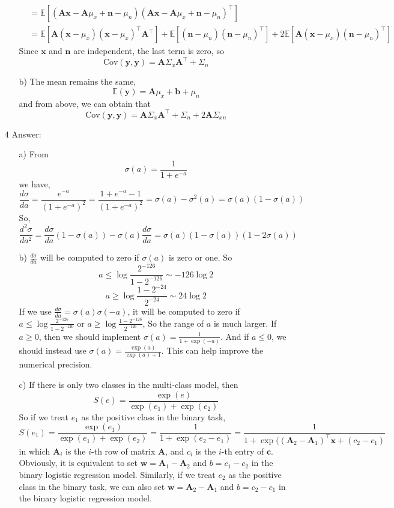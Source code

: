 \documentclass{article}
\begin{document}
\begin{itemize}
\begin{itemize}
\begin{equation*}
\begin{split}
	&= \mathbb{E}\left[\left(\mathbf{A}\mathbf{x} - \mathbf{A}\mu_x+\mathbf{n} - \mu_n\right) \left( \mathbf{A}\mathbf{x} - \mathbf{A}\mu_x+\mathbf{n} - \mu_n\right)^\top \right] \\
	&= \mathbb{E}\left[ \mathbf{A}\left(\mathbf{x} - \mu_x\right) \left(\mathbf{x} - \mu_x\right)^\top\mathbf{A}^\top \right] +  \mathbb{E}\left[\left(\mathbf{n} - \mu_n\right) \left(\mathbf{n} - \mu_n\right)^\top \right] + 2 \mathbb{E}\left[\mathbf{A}\left( \mathbf{x} - \mu_x\right) \left(\mathbf{n} - \mu_n\right)^\top \right] 
	\end{split}
	\end{equation*}
	Since $\mathbf{x}$ and $\mathbf{n}$ are independent, the last term is zero, so 
	$$\text{Cov}(\mathbf{y},\mathbf{y})  = \mathbf{A} \Sigma_x \mathbf{A}^\top + \Sigma_n$$
	\item[b)] The mean remains the same, 
	$$\mathbb{E}(\mathbf{y}) =  \mathbf{A}\mu_x+\mathbf{b}+\mu_n$$
	and from above, we can obtain that 
	$$\text{Cov}(\mathbf{y},\mathbf{y})  = \mathbf{A} \Sigma_x \mathbf{A}^\top + \Sigma_n + 2\mathbf{A}\Sigma_{xn}$$
	\end{itemize}
\item[4] Answer:
	\begin{itemize}
	\item[a)] From
	$$\sigma(a)=\frac{1}{1+e^{-a}}$$
	we have,
	$$\frac{d\sigma}{da} = \frac{e^{-a}}{(1+e^{-a})^2}  = \frac{1+e^{-a}-1}{(1+e^{-a})^2} = \sigma(a) - \sigma^2(a) = \sigma(a) (1-\sigma(a))$$
	So,
	$$\frac{d^2\sigma}{da^2} = \frac{d\sigma}{da} (1-\sigma(a)) - \sigma(a)\frac{d\sigma}{da} = \sigma(a) (1-\sigma(a))(1 - 2\sigma(a))$$
	\item[b)] $\frac{d\sigma}{da}$ will be computed to zero if $\sigma(a)$ is zero or one. So 
	$$a \leq \log \frac{2^{-126}}{1-2^{-126}} \sim -126 \log 2 $$
	$$a \geq \log \frac{1-2^{-24}}{2^{-24}} \sim 24 \log 2$$
	If we use $\frac{d\sigma}{da} =\sigma(a)\sigma(-a)$, it will be computed to zero if $a\leq  \log \frac{2^{-126}}{1-2^{-126}} $ or $a \geq  \log \frac{1-2^{-126}}{2^{-126}} $, So the range of $a$ is much larger.
	If $a\geq 0$, then we should implement $\sigma(a) = \frac{1}{1+\exp(-a)}$. And if $a \leq 0$, we should instead use $\sigma(a)=\frac{\exp(a)}{\exp(a)+1}$. This can help improve the numerical precision.
	\item[c)] If there is only two classes in the multi-class model, then 
	$$S(e) = \frac{\exp(e)}{\exp(e_1) + \exp(e_2)}$$
So if we treat $e_1$ as the positive class in the binary task, $$S(e_1) = \frac{\exp(e_1)}{\exp(e_1) + \exp(e_2)} = \frac{1}{1+\exp(e_2-e_1)} = \frac{1}{1+\exp((\mathbf{A}_2-\mathbf{A}_1)^\top\mathbf{x} + (c_2-c_1)}$$
in which $\mathbf{A}_i$ is the $i$-th row of matrix $\mathbf{A}$, and $c_i$ is the $i$-th entry of $\mathbf{c}$. Obviously, it is equivalent to set $\mathbf{w} = \mathbf{A}_1 - \mathbf{A}_2$ and $b=c_1-c_2$ in the binary logistic regression model.
	Similarly, if we treat $e_2$ as the positive class in the binary task, we can also set $\mathbf{w} = \mathbf{A}_2 - \mathbf{A}_1$ and $b=c_2-c_1$ in the binary logistic regression model.
	

\end{itemize}
\end{itemize}
\end{document}
